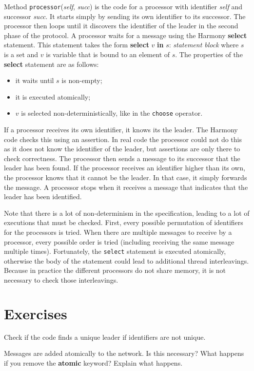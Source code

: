 \documentclass{report}
\begin{document}
Method \texttt{processor}(\textit{self}, \textit{succ}) is the
code for a processor with identifier \textit{self} and successor
\textit{succ}.
It starts simply by sending its own identifier to its successor.
The processor then loops until it discovers the identifier of the
leader in the second phase of the protocol.
A processor waits for a message using the Harmony \textbf{select} statement.
This statement takes the form \textbf{select} $v$ \textbf{in} $s$: \emph{statement block}
where $s$ is a set and $v$ is variable that is bound to an element of $s$.
The properties of the \textbf{select} statement are as follows:
\begin{itemize}
\item it waits until $s$ is non-empty;
\item it is executed atomically;
\item $v$ is selected non-deterministically, like in the \texttt{choose} operator.
\end{itemize}
%

If a processor receives its own identifier, it knows its the leader.
The Harmony code checks this using an assertion.
In real code the processor could not do this as it does not know
the identifier of the leader, but assertions are only there to check
correctness.
The processor then sends a message to its successor that the leader
has been found.
If the processor receives an identifier higher than its own, the
processor knows that it cannot be the leader.
In that case, it simply forwards the message.
A processor stops when it receives a message that indicates that
the leader has been identified.

Note that there is a lot of non-determinism in the specification, leading
to a lot of executions that must be checked.
First, every possible permutation of identifiers for the processors
is tried.  When there are multiple messages to receive by a processor,
every possible order is tried (including receiving the same message
multiple times).  Fortunately, the \texttt{select} statement is executed
atomically, otherwise the body of the statement could lead to additional
thread interleavings.  Because in practice the different processors do
not share memory, it is not necessary to check those interleavings.

\section*{Exercises}
\begin{problems}
\item Check if the code finds a unique leader if identifiers are not unique.
\item Messages are added atomically to the network.  Is this necessary?
What happens if you remove the \textbf{atomic} keyword?  Explain what happens.
\end{problems}
\end{document}

